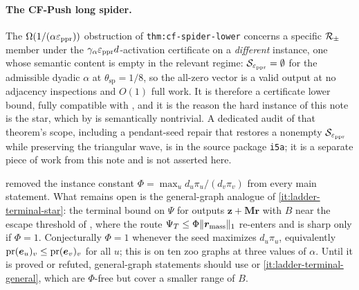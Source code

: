 \paragraph{The CF-Push long spider.}
The $\Omega(1/(\alpha\varepsilon_{\mathrm{ppr}}))$ obstruction of \texttt{thm:cf-spider-lower} concerns a specific $\mathcal{R}_{\pm}$ member
under the $\gamma_{\alpha}\varepsilon_{\mathrm{ppr}} d$-activation certificate on a \emph{different}
instance, one whose semantic content is empty in the relevant regime:
$\mathcal S_{\varepsilon_{\mathrm{ppr}}}=\emptyset$ for the admissible dyadic $\alpha$ at
$\theta_{\mathrm{sp}}=1/8$, so the all-zero vector is a valid output at
no adjacency inspections and $O(1)$ full work. It is therefore a certificate
lower bound, fully compatible with
, and it is the reason the hard instance
of this note is the star, which by  is
semantically nontrivial. A dedicated audit of that theorem's scope, including
a pendant-seed repair that restores a nonempty $\mathcal S_{\varepsilon_{\mathrm{ppr}}}$ while preserving
the triangular wave, is in the source package \texttt{i5a}; it is a separate
piece of work from this note and is not asserted here.

\begin{problem}
\label{open:ladder-phi}
 removed the instance constant
$\Phi=\max_{u}d_{u}\pi_{u}/(d_{v}\pi_{v})$ from every main statement. What
remains open is the general-graph analogue of
\ref{it:ladder-terminal-star}: the terminal bound on
$\Psi$ for outputs $\bm{z}+\bm{M}\bm{r}$ with $B$ near the escape threshold of
, where the route
$\Psi_{T}\le\Phi\lVert\bm{r}_{\mathrm{mass}}\rVert_{1}$ re-enters and is sharp only if
$\Phi=1$. Conjecturally $\Phi=1$ whenever the seed maximizes $d_{u}\pi_{u}$,
equivalently $\operatorname{pr}(\bm{e}_{u})_{v}\le\operatorname{pr}(\bm{e}_{v})_{v}$ for all $u$; this is
\statusmeasured{} on ten zoo graphs at three values of $\alpha$. Until it is
proved or refuted, general-graph statements should use
 or
\ref{it:ladder-terminal-general}, which are
$\Phi$-free but cover a smaller range of $B$.
\end{problem}


